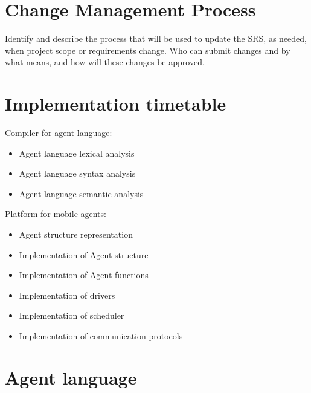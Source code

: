 \documentclass{scrreprt}
\begin{document}
\chapter{Change Management Process}

Identify and describe the process that will be used to update the SRS, as needed, when project scope or requirements change.  Who can submit changes and by what means, and how will these changes be approved.

\chapter{Implementation timetable}

Compiler for agent language:
\begin{itemize}
\item Agent language lexical analysis
\item Agent language syntax analysis
\item Agent language semantic analysis
\end{itemize}

Platform for mobile agents:

\begin{itemize}
\item Agent structure representation
\item Implementation of Agent structure
\item Implementation of Agent functions
\item Implementation of drivers
\item Implementation of scheduler
\item Implementation of communication protocols

\end{itemize}

\chapter {Agent language}
\end{document}

